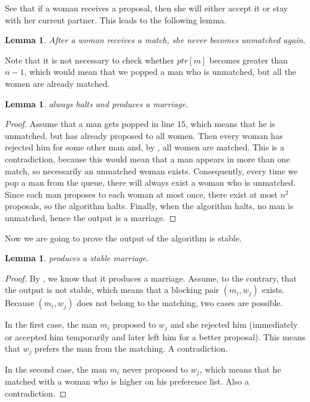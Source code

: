 \documentclass[12pt]{report}
\newtheorem{llemma}[base]{Lemma}
\numberwithin{algorithm}{chapter}
\begin{document}
	See that if a woman receives a proposal, then she will either accept it or stay with her current partner. This leads to the following lemma.
	\begin{llemma} \label{GaleWomanMatching}
		After a woman receives a match, she never becomes unmatched again.
	\end{llemma}

	Note that it is not necessary to check whether $\mathit{ptr}[m]$ becomes greater than $n - 1$, which would mean that we popped a man who is unmatched, but all the women are already matched.

	\begin{llemma}\label{GaleHaltsAndMarriage}
		 always halts and produces a marriage.
	\end{llemma}
	\begin{proof}
		Assume that a man gets popped in line $15$, which means that he is unmatched, but has already proposed to all women. Then every woman has rejected him for some other man and, by , all women are matched. This is a contradiction, because this would mean that a man appears in more than one match, so necessarily an unmatched woman exists. Consequently, every time we pop a man from the queue, there will always exist a woman who is unmatched. Since each man proposes to each woman at most once, there exist at most $n^{2}$ proposals, so the algorithm halts. Finally, when the algorithm halts, no man is unmatched, hence the output is a marriage.
	\end{proof}

	Now we are going to prove the output of the algorithm is stable.

	\begin{llemma}
	 produces a stable marriage.
	\end{llemma}
	\begin{proof}
		By , we know that it produces a marriage. Assume, to the contrary, that the output is not stable, which means that a blocking pair $(m_{i}, w_{j})$ exists. Because $(m_{i}, w_{j})$ does not belong to the matching, two cases are possible.
	
		In the first case, the man $m_{i}$ proposed to $w_{j}$ and she rejected him (immediately or accepted him temporarily and later left him for a better proposal). This means that $w_{j}$ prefers the man from the matching. A contradiction.
	
		In the second case, the man $m_{i}$ never proposed to $w_{j}$, which means that he matched with a woman who is higher on his preference list. Also a contradiction.
	\end{proof}
\end{document}
